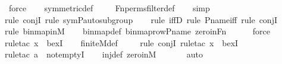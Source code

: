 \begin{isabellebody}
\ force\isanewline
\ \ \isamarkupfalse%
\ symmetric{\isacharunderscore}{\kern0pt}def\ \isanewline
\ \ \isamarkupfalse%
\ Fn{\isacharunderscore}{\kern0pt}perms{\isacharunderscore}{\kern0pt}filter{\isacharunderscore}{\kern0pt}def\isanewline
\ \ \isamarkupfalse%
\ simp\isanewline
\ \ \isamarkupfalse%
{\isacharparenleft}{\kern0pt}rule\ conjI{\isacharcomma}{\kern0pt}\ rule\ sym{\isacharunderscore}{\kern0pt}P{\isacharunderscore}{\kern0pt}auto{\isacharunderscore}{\kern0pt}subgroup{\isacharparenright}{\kern0pt}\isanewline
\ \ \ \isamarkupfalse%
{\isacharparenleft}{\kern0pt}rule\ iffD{}{\isacharcomma}{\kern0pt}\ rule\ P{\isacharunderscore}{\kern0pt}name{\isacharunderscore}{\kern0pt}iff{\isacharcomma}{\kern0pt}\ rule\ conjI{\isacharparenright}{\kern0pt}\isanewline
\ \ \ \ \isamarkupfalse%
{\isacharparenleft}{\kern0pt}rule\ binmap{\isacharprime}{\kern0pt}{\isacharunderscore}{\kern0pt}in{\isacharunderscore}{\kern0pt}M{\isacharparenright}{\kern0pt}\isanewline
\ \ \isamarkupfalse%
\ binmap{\isacharprime}{\kern0pt}{\isacharunderscore}{\kern0pt}def\ binmap{\isacharunderscore}{\kern0pt}row{\isacharprime}{\kern0pt}{\isacharunderscore}{\kern0pt}P{\isacharunderscore}{\kern0pt}name\ zero{\isacharunderscore}{\kern0pt}in{\isacharunderscore}{\kern0pt}Fn\ \isanewline
\ \ \ \isamarkupfalse%
\ force\isanewline
\ \ \isamarkupfalse%
{\isacharparenleft}{\kern0pt}rule{\isacharunderscore}{\kern0pt}tac\ x{\isacharequal}{\kern0pt}{}\ \ bexI{\isacharparenright}{\kern0pt}\isanewline
\ \ \isamarkupfalse%
\ finite{\isacharunderscore}{\kern0pt}M{\isacharunderscore}{\kern0pt}def\ \isanewline
\ \ \ \isamarkupfalse%
{\isacharparenleft}{\kern0pt}rule\ conjI{\isacharcomma}{\kern0pt}\ rule{\isacharunderscore}{\kern0pt}tac\ x{\isacharequal}{\kern0pt}{}\ \ bexI{\isacharparenright}{\kern0pt}\isanewline
\ \ \isamarkupfalse%
{\isacharparenleft}{\kern0pt}rule{\isacharunderscore}{\kern0pt}tac\ a{\isacharequal}{\kern0pt}{}\ \ not{\isacharunderscore}{\kern0pt}emptyI{\isacharparenright}{\kern0pt}\isanewline
\ \ \isamarkupfalse%
\ inj{\isacharunderscore}{\kern0pt}def\ zero{\isacharunderscore}{\kern0pt}in{\isacharunderscore}{\kern0pt}M\isanewline
\ \ \ \ \ \isamarkupfalse%
\ auto{\isacharbrackleft}{\kern0pt}{}{\isacharbrackright}{\kern0pt}\isanewline

\end{isabellebody}
